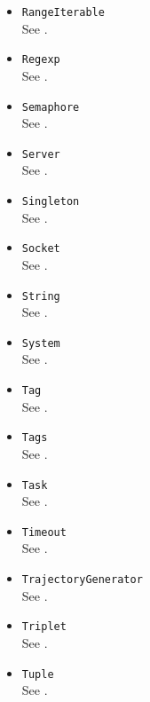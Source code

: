 \begin{itemize}
\item \lstinline|RangeIterable|\\
  See .

\item \lstinline|Regexp|\\
  See .

\item \lstinline|Semaphore|\\
  See .

\item \lstinline|Server|\\
  See .

\item \lstinline|Singleton|\\
  See .

\item \lstinline|Socket|\\
  See .

\item \lstinline|String|\\
  See .

\item \lstinline|System|\\
  See .

\item \lstinline|Tag|\\
  See .

\item \lstinline|Tags|\\
  See .

\item \lstinline|Task|\\
  See .

\item \lstinline|Timeout|\\
  See .

\item \lstinline|TrajectoryGenerator|\\
  See .

\item \lstinline|Triplet|\\
  See .

\item \lstinline|Tuple|\\
  See .


\end{itemize}
